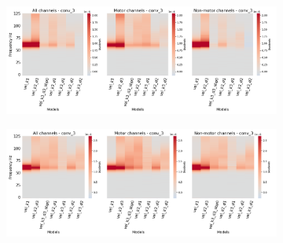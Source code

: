 \begin{figure}[!htpb]
\centering
\RawFloats
\begin{subfigure}[b]{\textwidth}
   \includegraphics[width=1\linewidth]{img/ch4/vel-conv-3-layer-grads-hp}
   \caption{}
\end{subfigure}\label{fig:vel-conv3-layer-grads-hp}

\begin{subfigure}[b]{\textwidth}
   \includegraphics[width=1\linewidth]{img/ch4/vel-conv-3-layer-grads-hp-shifted}
   \caption{}
\end{subfigure}\label{fig:vel-conv3-layer-grads-shifted-hp}
\caption[]{}
\end{figure}\label{fig:vel-shifted-vs-non-shifted-grads-hp}

